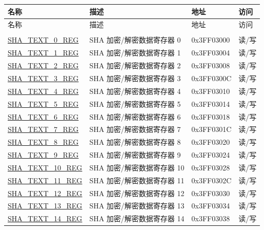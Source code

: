 \begin{longtable}{ | p{5cm} | p{7.2cm} | p{1.9cm} | p{0.9cm} | }
\hline\rowcolor{lightgray}
名称 & 描述 &  地址 & 访问 \\ \hline
\endfirsthead
        \hline
        \rowcolor{lightgray}
       名称 & 描述 & 地址 & 访问  \\
        \hline
        \endhead
        \endfoot
\multicolumn{4}{|l|}{\textbf{加密／解密数据寄存器}} \\ \hline
\hyperref[regdesc:SHATEXTnREG]{SHA\_TEXT\_0\_REG} & SHA 加密/解密数据寄存器 0 & 0x3FF03000 & 读/写 \\ \hline
\hyperref[regdesc:SHATEXTnREG]{SHA\_TEXT\_1\_REG} & SHA 加密/解密数据寄存器 1 & 0x3FF03004 & 读/写\\ \hline
\hyperref[regdesc:SHATEXTnREG]{SHA\_TEXT\_2\_REG} & SHA 加密/解密数据寄存器 2 & 0x3FF03008 & 读/写\\ \hline
\hyperref[regdesc:SHATEXTnREG]{SHA\_TEXT\_3\_REG} & SHA 加密/解密数据寄存器 3 & 0x3FF0300C & 读/写\\ \hline
\hyperref[regdesc:SHATEXTnREG]{SHA\_TEXT\_4\_REG} & SHA 加密/解密数据寄存器 4 & 0x3FF03010 & 读/写\\ \hline
\hyperref[regdesc:SHATEXTnREG]{SHA\_TEXT\_5\_REG} &SHA 加密/解密数据寄存器 5 & 0x3FF03014 & 读/写\\ \hline
\hyperref[regdesc:SHATEXTnREG]{SHA\_TEXT\_6\_REG} & SHA 加密/解密数据寄存器 6 & 0x3FF03018 & 读/写\\ \hline
\hyperref[regdesc:SHATEXTnREG]{SHA\_TEXT\_7\_REG} & SHA 加密/解密数据寄存器 7 & 0x3FF0301C & 读/写\\ \hline
\hyperref[regdesc:SHATEXTnREG]{SHA\_TEXT\_8\_REG} & SHA 加密/解密数据寄存器 8 & 0x3FF03020 & 读/写\\ \hline
\hyperref[regdesc:SHATEXTnREG]{SHA\_TEXT\_9\_REG} & SHA 加密/解密数据寄存器 9 & 0x3FF03024 & 读/写\\ \hline
\hyperref[regdesc:SHATEXTnREG]{SHA\_TEXT\_10\_REG} & SHA 加密/解密数据寄存器 10 & 0x3FF03028 & 读/写\\ \hline
\hyperref[regdesc:SHATEXTnREG]{SHA\_TEXT\_11\_REG} & SHA 加密/解密数据寄存器 11 & 0x3FF0302C & 读/写\\ \hline
\hyperref[regdesc:SHATEXTnREG]{SHA\_TEXT\_12\_REG} & SHA 加密/解密数据寄存器 12 & 0x3FF03030 & 读/写\\ \hline
\hyperref[regdesc:SHATEXTnREG]{SHA\_TEXT\_13\_REG} & SHA 加密/解密数据寄存器 13 & 0x3FF03034 & 读/写\\ \hline
\hyperref[regdesc:SHATEXTnREG]{SHA\_TEXT\_14\_REG} & SHA 加密/解密数据寄存器 14 & 0x3FF03038 & 读/写\\ \hline

\end{longtable}
